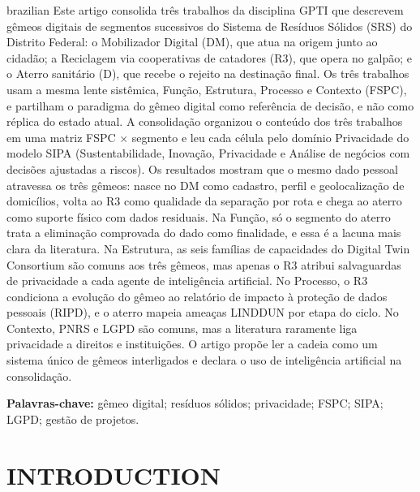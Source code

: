 \documentclass[12pt,a4paper,article,oneside,brazil,english]{abntex2}
\begin{document}
\begin{resumo}[Resumo]
\begin{otherlanguage*}{brazilian}
Este artigo consolida três trabalhos da disciplina GPTI que descrevem gêmeos digitais de segmentos sucessivos do Sistema de Resíduos Sólidos (SRS) do Distrito Federal: o Mobilizador Digital (DM), que atua na origem junto ao cidadão; a Reciclagem via cooperativas de catadores (R3), que opera no galpão; e o Aterro sanitário (D), que recebe o rejeito na destinação final. Os três trabalhos usam a mesma lente sistêmica, Função, Estrutura, Processo e Contexto (FSPC), e partilham o paradigma do gêmeo digital como referência de decisão, e não como réplica do estado atual. A consolidação organizou o conteúdo dos três trabalhos em uma matriz FSPC $\times$ segmento e leu cada célula pelo domínio Privacidade do modelo SIPA (Sustentabilidade, Inovação, Privacidade e Análise de negócios com decisões ajustadas a riscos). Os resultados mostram que o mesmo dado pessoal atravessa os três gêmeos: nasce no DM como cadastro, perfil e geolocalização de domicílios, volta ao R3 como qualidade da separação por rota e chega ao aterro como suporte físico com dados residuais. Na Função, só o segmento do aterro trata a eliminação comprovada do dado como finalidade, e essa é a lacuna mais clara da literatura. Na Estrutura, as seis famílias de capacidades do Digital Twin Consortium são comuns aos três gêmeos, mas apenas o R3 atribui salvaguardas de privacidade a cada agente de inteligência artificial. No Processo, o R3 condiciona a evolução do gêmeo ao relatório de impacto à proteção de dados pessoais (RIPD), e o aterro mapeia ameaças LINDDUN por etapa do ciclo. No Contexto, PNRS e LGPD são comuns, mas a literatura raramente liga privacidade a direitos e instituições. O artigo propõe ler a cadeia como um sistema único de gêmeos interligados e declara o uso de inteligência artificial na consolidação.

\vspace{\onelineskip}
\noindent\textbf{Palavras-chave:} gêmeo digital; resíduos sólidos; privacidade; FSPC; SIPA; LGPD; gestão de projetos.
\end{otherlanguage*}
\end{resumo}

\newpage

\section{INTRODUCTION}
\end{document}
